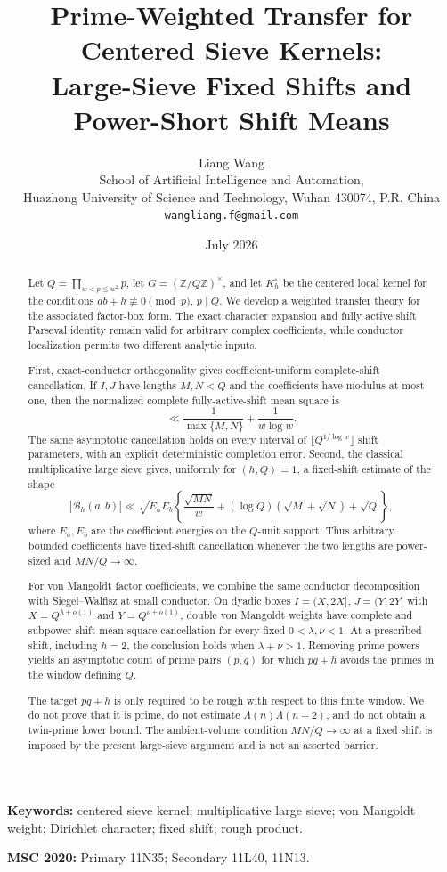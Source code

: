 \documentclass[11pt]{article}
\title{\textbf{Prime-Weighted Transfer for Centered Sieve Kernels:}\\
\textbf{Large-Sieve Fixed Shifts and Power-Short Shift Means}}
\author{Liang Wang\\
\small School of Artificial Intelligence and Automation,\\[-0.2em]
\small Huazhong University of Science and Technology, Wuhan 430074, P.R. China\\
\small \texttt{wangliang.f@gmail.com}}
\date{July 2026}
\theoremstyle{definition}
\theoremstyle{remark}
\newcommand{\Z}{\mathbb Z}
\newcommand{\cB}{\mathcal B}
\begin{document}
\maketitle

\begin{abstract}
Let $Q=\prod_{w<p\le w^2}p$, let $G=(\Z/Q\Z)^\times$, and let $K_h^\circ$ be the centered local kernel for the conditions $ab+h\not\equiv0\pmod p$, $p\mid Q$.  We develop a weighted transfer theory for the associated factor-box form.  The exact character expansion and fully active shift Parseval identity remain valid for arbitrary complex coefficients, while conductor localization permits two different analytic inputs.

First, exact-conductor orthogonality gives coefficient-uniform complete-shift cancellation.  If $I,J$ have lengths $M,N<Q$ and the coefficients have modulus at most one, then the normalized complete fully-active-shift mean square is
\[
 \ll \frac1{\max\{M,N\}}+\frac1{w\log w}.
\]
The same asymptotic cancellation holds on every interval of $\lfloor Q^{1/\log w}\rfloor$ shift parameters, with an explicit deterministic completion error.  Second, the classical multiplicative large sieve gives, uniformly for $(h,Q)=1$, a fixed-shift estimate of the shape
\[
 |\cB_h(a,b)|
 \ll \sqrt{E_aE_b}
 \left\{
  \frac{\sqrt{MN}}w+(\log Q)(\sqrt M+\sqrt N)+\sqrt Q
 \right\},
\]
where $E_a,E_b$ are the coefficient energies on the $Q$-unit support.  Thus arbitrary bounded coefficients have fixed-shift cancellation whenever the two lengths are power-sized and $MN/Q\to\infty$.

For von Mangoldt factor coefficients, we combine the same conductor decomposition with Siegel--Walfisz at small conductor.  On dyadic boxes $I=(X,2X]$, $J=(Y,2Y]$ with $X=Q^{\lambda+o(1)}$ and $Y=Q^{\nu+o(1)}$, double von Mangoldt weights have complete and subpower-shift mean-square cancellation for every fixed $0<\lambda,\nu<1$.  At a prescribed shift, including $h=2$, the conclusion holds when $\lambda+\nu>1$.  Removing prime powers yields an asymptotic count of prime pairs $(p,q)$ for which $pq+h$ avoids the primes in the window defining $Q$.

The target $pq+h$ is only required to be rough with respect to this finite window.  We do not prove that it is prime, do not estimate $\Lambda(n)\Lambda(n+2)$, and do not obtain a twin-prime lower bound.  The ambient-volume condition $MN/Q\to\infty$ at a fixed shift is imposed by the present large-sieve argument and is not an asserted barrier.
\end{abstract}

\noindent\textbf{Keywords:} centered sieve kernel; multiplicative large sieve; von Mangoldt weight; Dirichlet character; fixed shift; rough product.

\medskip
\noindent\textbf{MSC 2020:} Primary 11N35; Secondary 11L40, 11N13.








\end{document}
